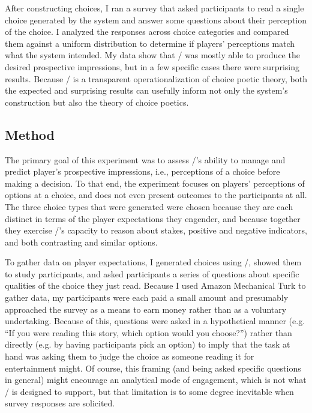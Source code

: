 After constructing choices, I ran a survey that asked participants to read a single choice generated by the system and answer some questions about their perception of the choice.
%
I analyzed the responses across choice categories and compared them against a uniform distribution to determine if players' perceptions match what the system intended.
%
My data show that \dunyazad/ was mostly able to produce the desired prospective impressions, but in a few specific cases there were surprising results.
%
Because \dunyazad/ is a transparent operationalization of choice poetic theory, both the expected and surprising results can usefully inform not only the system's construction but also the theory of choice poetics.


\subsection{Method}

\label{sec:e1-method}

The primary goal of this experiment was to assess \dunyazad/'s ability to manage and predict player's prospective impressions, i.e., perceptions of a choice before making a decision.
%
To that end, the experiment focuses on players' perceptions of options at a choice, and does not even present outcomes to the participants at all.
%
The three choice types that were generated were chosen because they are each distinct in terms of the player expectations they engender, and because together they exercise \dunyazad/'s capacity to reason about stakes, positive and negative indicators, and both contrasting and similar options.


To gather data on player expectations, I generated choices using \dunyazad/, showed them to study participants, and asked participants a series of questions about specific qualities of the choice they just read.
%
Because I used Amazon Mechanical Turk to gather data, my participants were each paid a small amount and presumably approached the survey as a means to earn money rather than as a voluntary undertaking.
%
Because of this, questions were asked in a hypothetical manner (e.g. ``If you were reading this story, which option would you choose?'') rather than directly (e.g. by having participants pick an option) to imply that the task at hand was asking them to judge the choice as someone reading it for entertainment might.
%
Of course, this framing (and being asked specific questions in general) might encourage an analytical mode of engagement, which is not what \dunyazad/ is designed to support, but that limitation is to some degree inevitable when survey responses are solicited.



